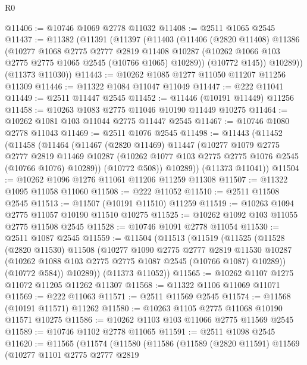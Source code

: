 \begin{lexlean}{R0}
\begin{coremodule}
@11406 := @10746 @1069 @2778 @11032
@11408 := @2511 @1065 @2545
@11437 := @11382
    (@11391
      (@11397
        (@11403
          (@11406
            (@2820 @11408)
            @11386
            (@10277
              @1068
              @2775
              @2777
              @2819
              @11408
              @10287
              (@10262 @1066 @103 @2775 @2775 @1065 @2545 (@10766 @1065) @10289))
            (@10772 @145))
          @10289))
      (@11373 @11030))
@11443 := @10262 @1085 @1277 @11050 @11207 @11256 @11309
@11446 := @11322 @1084 @11047 @11049
@11447 := @222 @11041
@11449 := @2511 @11447 @2545
@11452 := @11446 (@10191 @11449) @11256
@11458 := @10263 @1083 @2775 @11046 @10190 @11449 @10275
@11464 := @10262 @1081 @103 @11044 @2775 @11447 @2545
@11467 := @10746 @1080 @2778 @11043
@11469 := @2511 @1076 @2545
@11498 := @11443
    (@11452
      (@11458
        (@11464
          (@11467
            (@2820 @11469)
            @11447
            (@10277
              @1079
              @2775
              @2777
              @2819
              @11469
              @10287
              (@10262 @1077 @103 @2775 @2775 @1076 @2545 (@10766 @1076) @10289))
            (@10772 @508))
          @10289))
      (@11373 @11041))
@11504 := @10262 @1096 @1276 @11061 @11206 @11259 @11308
@11507 := @11322 @1095 @11058 @11060
@11508 := @222 @11052
@11510 := @2511 @11508 @2545
@11513 := @11507 (@10191 @11510) @11259
@11519 := @10263 @1094 @2775 @11057 @10190 @11510 @10275
@11525 := @10262 @1092 @103 @11055 @2775 @11508 @2545
@11528 := @10746 @1091 @2778 @11054
@11530 := @2511 @1087 @2545
@11559 := @11504
    (@11513
      (@11519
        (@11525
          (@11528
            (@2820 @11530)
            @11508
            (@10277
              @1090
              @2775
              @2777
              @2819
              @11530
              @10287
              (@10262 @1088 @103 @2775 @2775 @1087 @2545 (@10766 @1087) @10289))
            (@10772 @584))
          @10289))
      (@11373 @11052))
@11565 := @10262 @1107 @1275 @11072 @11205 @11262 @11307
@11568 := @11322 @1106 @11069 @11071
@11569 := @222 @11063
@11571 := @2511 @11569 @2545
@11574 := @11568 (@10191 @11571) @11262
@11580 := @10263 @1105 @2775 @11068 @10190 @11571 @10275
@11586 := @10262 @1103 @103 @11066 @2775 @11569 @2545
@11589 := @10746 @1102 @2778 @11065
@11591 := @2511 @1098 @2545
@11620 := @11565
    (@11574
      (@11580
        (@11586
          (@11589
            (@2820 @11591)
            @11569
            (@10277
              @1101
              @2775
              @2777
              @2819

\end{coremodule}
\end{lexlean}
